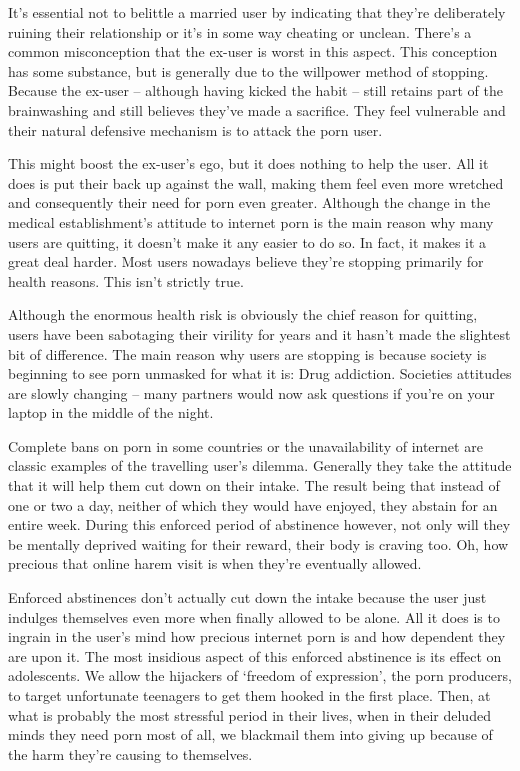\documentclass[
]{book}
\begin{document}
It's essential not to belittle a married user by indicating that they're deliberately ruining their relationship or it's in some way cheating or unclean. There's a common misconception that the ex-user is worst in this aspect. This conception has some substance, but is generally due to the willpower method of stopping. Because the ex-user -- although having kicked the habit -- still retains part of the brainwashing and still believes they've made a sacrifice. They feel vulnerable and their natural defensive mechanism is to attack the porn user.

This might boost the ex-user's ego, but it does nothing to help the user. All it does is put their back up against the wall, making them feel even more wretched and consequently their need for porn even greater. Although the change in the medical establishment's attitude to internet porn is the main reason why many users are quitting, it doesn't make it any easier to do so. In fact, it makes it a great deal harder. Most users nowadays believe they're stopping primarily for health reasons. This isn't strictly true.

Although the enormous health risk is obviously the chief reason for quitting, users have been sabotaging their virility for years and it hasn't made the slightest bit of difference. The main reason why users are stopping is because society is beginning to see porn unmasked for what it is: Drug addiction. Societies attitudes are slowly changing -- many partners would now ask questions if you're on your laptop in the middle of the night.

Complete bans on porn in some countries or the unavailability of internet are classic examples of the travelling user's dilemma. Generally they take the attitude that it will help them cut down on their intake. The result being that instead of one or two a day, neither of which they would have enjoyed, they abstain for an entire week. During this enforced period of abstinence however, not only will they be mentally deprived waiting for their reward, their body is craving too. Oh, how precious that online harem visit is when they're eventually allowed.

Enforced abstinences don't actually cut down the intake because the user just indulges themselves even more when finally allowed to be alone. All it does is to ingrain in the user's mind how precious internet porn is and how dependent they are upon it. The most insidious aspect of this enforced abstinence is its effect on adolescents. We allow the hijackers of `freedom of expression', the porn producers, to target unfortunate teenagers to get them hooked in the first place. Then, at what is probably the most stressful period in their lives, when in their deluded minds they need porn most of all, we blackmail them into giving up because of the harm they're causing to themselves.
\end{document}
